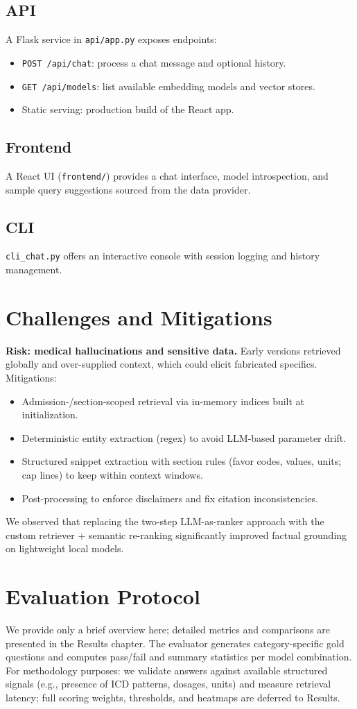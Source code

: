 \subsection{API}
A Flask service in \texttt{api/app.py} exposes endpoints:
\begin{itemize}
  \item \texttt{POST /api/chat}: process a chat message and optional history.
  \item \texttt{GET /api/models}: list available embedding models and vector stores.
  \item Static serving: production build of the React app.
\end{itemize}
\subsection{Frontend}
A React UI (\texttt{frontend/}) provides a chat interface, model introspection, and sample query suggestions sourced from the data provider.
\subsection{CLI}
\texttt{cli\_chat.py} offers an interactive console with session logging and history management.

\section{Challenges and Mitigations}
\textbf{Risk: medical hallucinations and sensitive data.} Early versions retrieved globally and over-supplied context, which could elicit fabricated specifics. Mitigations:
\begin{itemize}
  \item Admission-/section-scoped retrieval via in-memory indices built at initialization.
  \item Deterministic entity extraction (regex) to avoid LLM-based parameter drift.
  \item Structured snippet extraction with section rules (favor codes, values, units; cap lines) to keep within context windows.
  \item Post-processing to enforce disclaimers and fix citation inconsistencies.
\end{itemize}
We observed that replacing the two-step LLM-as-ranker approach with the custom retriever + semantic re-ranking significantly improved factual grounding on lightweight local models.

\section{Evaluation Protocol}
We provide only a brief overview here; detailed metrics and comparisons are presented in the Results chapter. The evaluator generates category-specific gold questions and computes pass/fail and summary statistics per model combination. For methodology purposes: we validate answers against available structured signals (e.g., presence of ICD patterns, dosages, units) and measure retrieval latency; full scoring weights, thresholds, and heatmaps are deferred to Results.

